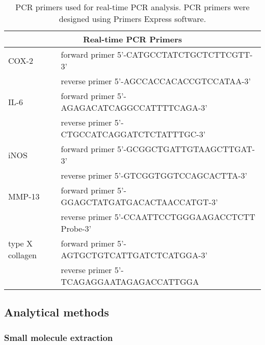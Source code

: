 \begin{refsection}
\begin{table}[h!]
    \centering
\begin{tabular}{ ll }
  \hline
  \multicolumn{2}{c}{Real-time PCR Primers} \\
  \hline

  COX-2 & forward primer 5'-CATGCCTATCTGCTCTTCGTT-3' \\
  & reverse primer 5'-AGCCACCACACCGTCCATAA-3' \\
  IL-6 & forward primer 5'-AGAGACATCAGGCCATTTTCAGA-3' \\
  & reverse primer 5'-CTGCCATCAGGATCTCTATTTGC-3' \\
  iNOS & forward primer 5'-GCGGCTGATTGTAAGCTTGAT-3' \\
  & reverse primer 5'-GTCGGTGGTCCAGCACTTA-3' \\
  MMP-13 & forward primer 5'-GGAGCTATGATGACACTAACCATGT-3' \\
  & reverse primer 5'-CCAATTCCTGGGAAGACCTCTT Probe-3' \\
  type X collagen & forward primer 5'-AGTGCTGTCATTGATCTCATGGA-3' \\
  & reverse primer 5'-TCAGAGGAATAGAGACCATTGGA \\

  \hline
\end{tabular}
\caption{PCR primers used for real-time PCR analysis. PCR primers were designed
using Primers Express software.}
\label{tab:pcr_primers}
\end{table}

\subsection{Analytical methods}

\subsubsection{Small molecule extraction}



\end{refsection}

